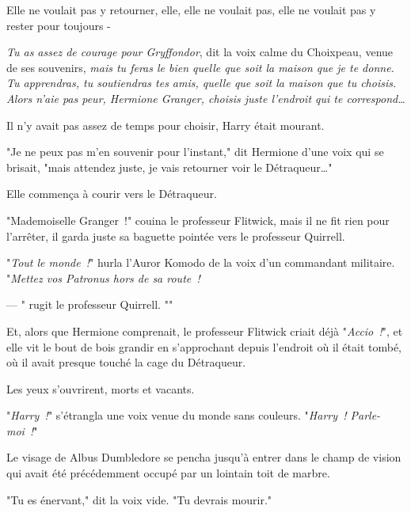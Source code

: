 Elle ne voulait pas y retourner, elle, elle ne voulait pas, elle ne voulait pas y rester pour toujours -

\emph{Tu as assez de courage pour Gryffondor}, dit la voix calme du Choixpeau, venue de ses souvenirs, \emph{mais tu feras le bien quelle que soit la maison que je te donne. Tu apprendras, tu soutiendras tes amis, quelle que soit la maison que tu choisis. Alors n'aie pas peur, Hermione Granger, choisis juste l'endroit qui te correspond…}

Il n'y avait pas assez de temps pour choisir, Harry était mourant.

"Je ne peux pas m'en souvenir pour l'instant," dit Hermione d'une voix qui se brisait, "mais attendez juste, je vais retourner voir le Détraqueur…"

Elle commença à courir vers le Détraqueur.

"Mademoiselle Granger~!" couina le professeur Flitwick, mais il ne fit rien pour l'arrêter, il garda juste sa baguette pointée vers le professeur Quirrell.

"\emph{Tout le monde~!}" hurla l'Auror Komodo de la voix d'un commandant militaire. "\emph{Mettez vos Patronus hors de sa route~!}

--- " rugit le professeur Quirrell. ""

Et, alors que Hermione comprenait, le professeur Flitwick criait déjà "\emph{Accio~!}", et elle vit le bout de bois grandir en s'approchant depuis l'endroit où il était tombé, où il avait presque touché la cage du Détraqueur.

\later

Les yeux s'ouvrirent, morts et vacants.

"\emph{Harry~!}" s'étrangla une voix venue du monde sans couleurs. "\emph{Harry~! Parle-moi~!}"

Le visage de Albus Dumbledore se pencha jusqu'à entrer dans le champ de vision qui avait été précédemment occupé par un lointain toit de marbre.

"Tu es énervant," dit la voix vide. "Tu devrais mourir."

